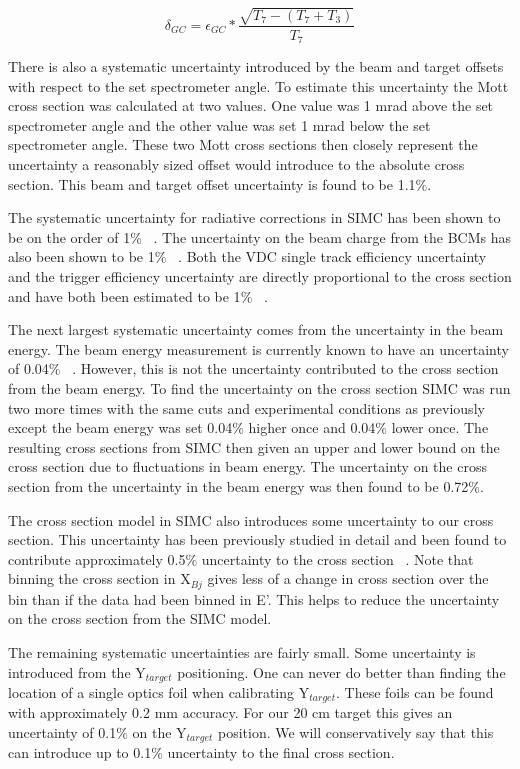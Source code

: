 \begin{equation} \label{eq:gc_uncertainty}
	\delta_{GC} = \epsilon_{GC} * \frac{\sqrt{T_7-(T_7+T_3)}}{T_7}
\end{equation}

There is also a systematic uncertainty introduced by the beam and target offsets with respect to the set spectrometer angle. To estimate this uncertainty the Mott cross section was calculated at two values. One value was 1 mrad above the set spectrometer angle and the other value was set 1 mrad below the set spectrometer angle. These two Mott cross sections then closely represent the uncertainty a reasonably sized offset would introduce to the absolute cross section. This beam and target offset uncertainty is found to be 1.1$\%$.

The systematic uncertainty for radiative corrections in SIMC has been shown to be on the order of 1$\%$ ~\cite{Thesis:Wang}. The uncertainty on the beam charge from the BCMs has also been shown to be 1$\%$ ~\cite{Thesis:Wang}. Both the VDC single track efficiency uncertainty and the trigger efficiency uncertainty are directly proportional to the cross section and have both been estimated to be 1$\%$ ~\cite{Thesis:Ye}.

The next largest systematic uncertainty comes from the uncertainty in the beam energy. The beam energy measurement is currently known to have an uncertainty of 0.04$\%$ ~\cite{doug}. However, this is not the uncertainty contributed to the cross section from the beam energy. To find the uncertainty on the cross section SIMC was run two more times with the same cuts and experimental conditions as previously except the beam energy was set 0.04$\%$ higher once and 0.04$\%$ lower once. The resulting cross sections from SIMC then given an upper and lower bound on the cross section due to fluctuations in beam energy. The uncertainty on the cross section from the uncertainty in the beam energy was then found to be 0.72$\%$.

The cross section model in SIMC also introduces some uncertainty to our cross section. This uncertainty has been previously studied in detail and been found to contribute approximately 0.5$\%$ uncertainty to the cross section ~\cite{Thesis:Nguyen}. Note that binning the cross section in X$_{Bj}$ gives less of a change in cross section over the bin than if the data had been binned in E'. This helps to reduce the uncertainty on the cross section from the SIMC model.

The remaining systematic uncertainties are fairly small. Some uncertainty is introduced from the Y$_{target}$ positioning. One can never do better than finding the location of a single optics foil when calibrating Y$_{target}$. These foils can be found with approximately 0.2 mm accuracy. For our 20 cm target this gives an uncertainty of 0.1$\%$ on the Y$_{target}$ position. We will conservatively say that this can introduce up to 0.1$\%$ uncertainty to the final cross section. 

